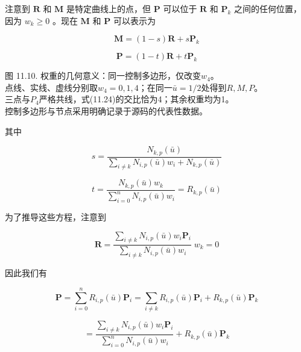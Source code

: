 \documentclass[../main.tex]{subfiles}
\begin{document}
注意到 \(\mathbf{R}\) 和 \(\mathbf{M}\) 是特定曲线上的点，但 \(\mathbf{P}\) 可以位于 \(\mathbf{R}\) 和 \({\mathbf{P}}_{k}\) 之间的任何位置，因为 \({w}_{k} \geq  0\) 。现在 \(\mathbf{M}\) 和 \(\mathbf{P}\) 可以表示为

\[
\mathbf{M} = \left( {1 - s}\right) \mathbf{R} + s{\mathbf{P}}_{k}
\]

\[
\mathbf{P} = \left( {1 - t}\right) \mathbf{R} + t{\mathbf{P}}_{k} \tag{11.22}
\]

\begin{center}
\begin{minipage}{26cm}
\centering
{}
\par\smallskip
图 11.10. 权重的几何意义：同一控制多边形，仅改变$w_4$。\\
点线、实线、虚线分别取$w_4=0,1,4$；在同一$\bar u=1/2$处得到$R,M,P$。\\
三点与$P_4$严格共线，式(11.24)的交比恰为4；其余权重均为1。\\
控制多边形与节点采用明确记录于源码的代表性数据。
\end{minipage}
\end{center}

其中

\[
s = \frac{{N}_{k,p}\left( \bar{u}\right) }{\mathop{\sum }\limits_{{i \neq  k}}{N}_{i,p}\left( \bar{u}\right) {w}_{i} + {N}_{k,p}\left( \bar{u}\right) }
\]

\[
t = \frac{{N}_{k,p}\left( \bar{u}\right) {w}_{k}}{\mathop{\sum }\limits_{{i = 0}}^{n}{N}_{i,p}\left( \bar{u}\right) {w}_{i}} = {R}_{k,p}\left( \bar{u}\right)  \tag{11.23}
\]

为了推导这些方程，注意到

\[
\mathbf{R} = \frac{\mathop{\sum }\limits_{{i \neq  k}}{N}_{i,p}\left( \bar{u}\right) {w}_{i}{\mathbf{P}}_{i}}{\mathop{\sum }\limits_{{i \neq  k}}{N}_{i,p}\left( \bar{u}\right) {w}_{i}}\;{w}_{k} = 0
\]

因此我们有

\[
\mathbf{P} = \mathop{\sum }\limits_{{i = 0}}^{n}{R}_{i,p}\left( \bar{u}\right) {\mathbf{P}}_{i} = \mathop{\sum }\limits_{{i \neq  k}}{R}_{i,p}\left( \bar{u}\right) {\mathbf{P}}_{i} + {R}_{k,p}\left( \bar{u}\right) {\mathbf{P}}_{k}
\]

\[
= \frac{\mathop{\sum }\limits_{{i \neq  k}}{N}_{i,p}\left( \bar{u}\right) {w}_{i}{\mathbf{P}}_{i}}{\mathop{\sum }\limits_{{i = 0}}^{n}{N}_{i,p}\left( \bar{u}\right) {w}_{i}} + {R}_{k,p}\left( \bar{u}\right) {\mathbf{P}}_{k}
\]
\end{document}
